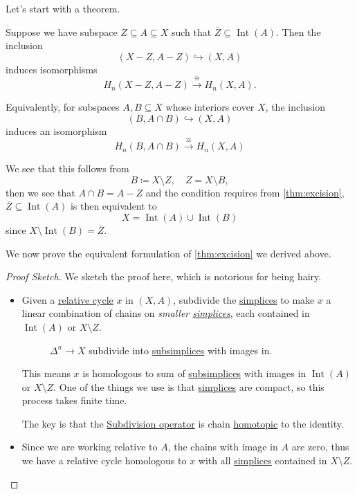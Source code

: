 Let's start with a theorem.
\begin{theorem}[Excision]\label{thm:excision}
	Suppose we have subspace \(Z \subseteq A \subseteq X\) such that \(\overline{Z} \subseteq \operatorname{Int} (A)\). Then the inclusion
	\[
		(X - Z, A - Z) \hookrightarrow (X, A)
	\]
	induces isomorphisms
	\[
		H_n(X - Z, A - Z) \xrightarrow{\cong} H_n(X, A).
	\]
\end{theorem}
\begin{remark}
	Equivalently, for subspaces \(A, B \subseteq X\) whose interiors cover \(X\), the inclusion
	\[
		(B, A \cap B) \hookrightarrow (X, A)
	\]
	induces an isomorphism
	\[
		H_n(B, A \cap B) \xrightarrow{\cong} H_n(X, A)
	\]
\end{remark}
\begin{explanation}
	We see that this follows from
	\[
		B \coloneqq X \setminus Z,\quad Z = X \setminus B,
	\]
	then we see that \(A \cap B = A - Z\) and the condition requires from \autoref{thm:excision},
	\(\overline{Z} \subseteq \operatorname{Int}(A)\) is then equivalent to
	\[
		X = \operatorname{Int}(A) \cup \operatorname{Int}(B)
	\]
	since \(X \setminus \operatorname{Int}(B) = \overline{Z} \).
	\begin{figure}[H]
		\centering
		\label{fig:eg:excision-1}
	\end{figure}
\end{explanation}
We now prove the equivalent formulation of \autoref{thm:excision} we derived above.
\begin{proof}[Proof Sketch]
	We sketch the proof here, which is notorious for being hairy.
	\begin{itemize}
		\item Given a \hyperref[def:relative-cycle]{relative cycle} \(x\) in \((X, A)\), subdivide the \hyperref[def:standard-simplex]{simplices} to make \(x\) a
		      linear combination of chains on \emph{smaller \hyperref[def:standard-simplex]{simplices}}, each contained in \(\operatorname{Int}(A)\) or \(X \setminus Z\).
		      \begin{figure}[H]
			      \centering
			      \caption{\(\Delta ^n\to X\) subdivide into \hyperref[def:subsimplex]{subsimplices} with images in. }
			      \label{fig:pf:excision}
		      \end{figure}
		      This means \(x\) is homologous to sum of \hyperref[def:subsimplex]{subsimplices} with images in \(\operatorname{Int}(A)\) or \(X \setminus Z\). One of the things we
		      use is that \hyperref[def:standard-simplex]{simplices} are compact, so this process takes finite time.

		      The key is that the \underline{Subdivision operator} is chain \hyperref[def:homotopic]{homotopic} to the identity.
		\item Since we are working relative to \(A\), the chains with image in \(A\) are zero, thus we have a relative cycle homologous to \(x\)
		      with all \hyperref[def:standard-simplex]{simplices} contained in \(X \setminus Z\).
	\end{itemize}
\end{proof}

